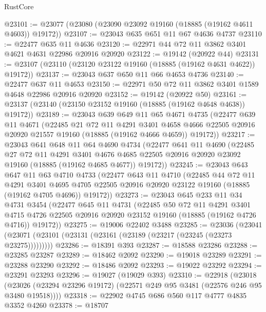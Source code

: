 \begin{lexlean}{RustCore}
\begin{coremodule}
@23101 := @23077 (@23080 (@23090 @23092 @19160 (@18885 (@19162 @4611 @4603)) @19172))
@23107 := @23043 @635 @651 @11 @67 @4636 @4737
@23110 := @22477 @635 @11 @4636
@23120 := @22971 @44 @72 @11 @3862 @3401 @4621 @4631 @22986 @20916 @20920
@23122 := @19142 (@20922 @44)
@23131 := @23107 (@23110 (@23120 @23122 @19160 (@18885 (@19162 @4631 @4622)) @19172))
@23137 := @23043 @637 @650 @11 @66 @4653 @4736
@23140 := @22477 @637 @11 @4653
@23150 := @22971 @50 @72 @11 @3862 @3401 @1589 @4648 @22986 @20916 @20920
@23152 := @19142 (@20922 @50)
@23161 := @23137 (@23140 (@23150 @23152 @19160 (@18885 (@19162 @4648 @4638)) @19172))
@23189 := @23043
    @639
    @649
    @11
    @65
    @4671
    @4735
    (@22477
      @639
      @11
      @4671
      (@22485
        @21
        @72
        @11
        @4291
        @3401
        @4658
        @4666
        @22505
        @20916
        @20920
        @21557
        @19160
        (@18885 (@19162 @4666 @4659))
        @19172))
@23217 := @23043
    @641
    @648
    @11
    @64
    @4690
    @4734
    (@22477
      @641
      @11
      @4690
      (@22485
        @27
        @72
        @11
        @4291
        @3401
        @4676
        @4685
        @22505
        @20916
        @20920
        @23092
        @19160
        (@18885 (@19162 @4685 @4677))
        @19172))
@23245 := @23043
    @643
    @647
    @11
    @63
    @4710
    @4733
    (@22477
      @643
      @11
      @4710
      (@22485
        @44
        @72
        @11
        @4291
        @3401
        @4695
        @4705
        @22505
        @20916
        @20920
        @23122
        @19160
        (@18885 (@19162 @4705 @4696))
        @19172))
@23273 := @23043
    @645
    @233
    @11
    @34
    @4731
    @3454
    (@22477
      @645
      @11
      @4731
      (@22485
        @50
        @72
        @11
        @4291
        @3401
        @4715
        @4726
        @22505
        @20916
        @20920
        @23152
        @19160
        (@18885 (@19162 @4726 @4716))
        @19172))
@23275 := @19006 @22402 @3488
@23285 := @23036
    (@23041 (@23071 (@23101 (@23131 (@23161 (@23189 (@23217 (@23245 (@23273 @23275)))))))))
@23286 := @18391 @393
@23287 := @18588 @23286
@23288 := @23285 @23287
@23289 := @18462 @2092
@23290 := @19018 @23289
@23291 := @23288 @23290
@23292 := @18486 @2092
@23293 := @19022 @23292
@23294 := @23291 @23293
@23296 := @19027 (@19029 @393)
@23310 := @22918
    (@23018 (@23026 (@23294 @23296 @19172) (@22571 @249 @95 @3481 (@22576 @246 @95 @3480 @19518))))
@23318 := @22902 @4745 @686 @560 @117 @4777 @4835 @3352 @4260
@23378 := @18707

\end{coremodule}
\end{lexlean}
